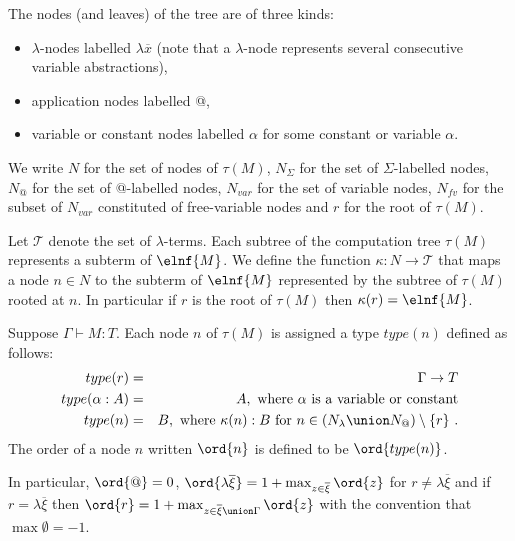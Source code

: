 The nodes (and leaves) of the tree are of three kinds:
\begin{itemize}
\item $\lambda$-nodes labelled $\lambda \overline{x}$ (note that a $\lambda$-node represents several consecutive variable abstractions),
\item application nodes labelled @,
\item variable or constant nodes labelled $\alpha$ for some constant or variable $\alpha$.
\end{itemize}
We write $N$ for the set of nodes of $\tau(M)$, $N_\Sigma$ for the set of $\Sigma$-labelled nodes,
$N_@$ for the set of @-labelled nodes, $N_{var}$ for the set of variable nodes,
$N_{fv}$ for the subset of $N_{var}$ constituted of free-variable nodes and $r$ for the root of $\tau(M)$.


Let $\mathcal{T}$ denote the set of $\lambda$-terms.
Each subtree of the computation tree $\tau(M)$ represents a subterm of $\elnf{M}$.
We define the function $\kappa : N \rightarrow \mathcal{T}$ that maps a node $n \in N$ to the subterm of $\elnf{M}$
represented by the subtree of $\tau(M)$ rooted at $n$.
In particular if $r$ is the root of $\tau(M)$ then $\kappa(r) = \elnf{M}$.

\begin{dfn}
\label{def:nodeorder}
Suppose $\Gamma \vdash M : T$.
Each node $n$ of $\tau(M)$ is assigned a type $type(n)$ defined as follows:
\begin{eqnarray*}
type(r) &=& \Gamma \rightarrow T \\
type(\alpha:A) &=& A, \mbox{ where $\alpha$ is a variable or constant} \\
type(n) &=& B, \hbox{ where
$\kappa(n) : B$ for $n \in (N_\lambda \union N_@) \setminus \{r \}$\ .}
\end{eqnarray*}
The order of a node $n$ written $\ord{n}$ is defined to be $\ord{type(n)}$.
\end{dfn}

In particular, $\ord{@} = 0$, $\ord{\lambda \overline{\xi}} = 1+ \max_{z\in \overline{\xi}} \ord{z}$ for $r \neq \lambda \overline{\xi}$
and if $r=\lambda \overline{\xi}$ then $\ord{r} = 1 + \max_{z\in \overline{\xi}\union \Gamma} \ord{z}$ with the convention that $\max \emptyset = -1$.

